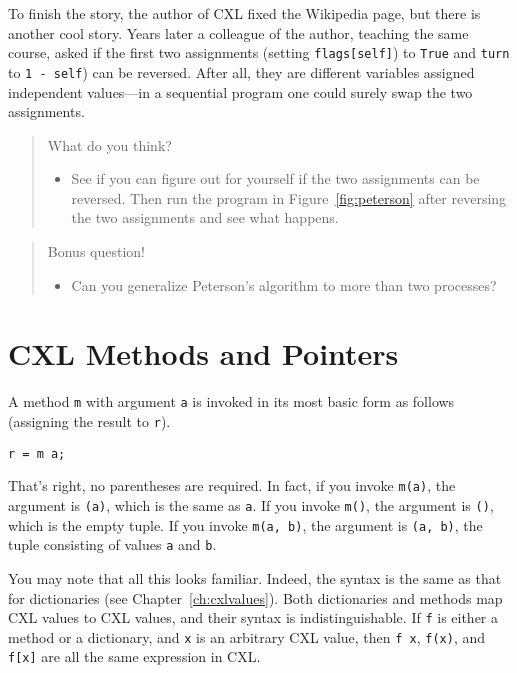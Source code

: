 \documentclass{report}
\newenvironment{code}{
\tcolorbox
}{
\endtcolorbox
}
\begin{document}
To finish the story, the author of CXL fixed the Wikipedia page, but there
is another cool story.  Years later a colleague of the author, teaching
the same course, asked if the first two assignments (setting \texttt{flags[self]})
to \texttt{True} and \texttt{turn} to \texttt{1 - self}) can be reversed.
After all, they are different variables assigned independent values---in a
sequential program one could surely swap the two assignments.

\begin{quote}
What do you think?
\begin{itemize}
\item See if you can figure out for yourself if the two assignments can be
reversed.  Then run the program in Figure~\ref{fig:peterson} after reversing
the two assignments and see what happens.
\end{itemize}
\end{quote}

\begin{quote}
Bonus question!
\begin{itemize}
\item Can you generalize Peterson's algorithm to more than two processes?
\end{itemize}
\end{quote}

\chapter{CXL Methods and Pointers}

A method \texttt{m} with argument \texttt{a} is invoked in its
most basic form as follows (assigning the result to \texttt{r}).
\begin{code}
\begin{verbatim}
r = m a;
\end{verbatim}
\end{code}
That's right, no parentheses are required.  In fact, if you invoke
\texttt{m(a)}, the argument is \texttt{(a)}, which is the same
as \texttt{a}.
If you invoke \texttt{m()}, the argument is \texttt{()},
which is the empty tuple.
If you invoke \texttt{m(a, b)}, the argument is \texttt{(a, b)},
the tuple consisting of values \texttt{a} and \texttt{b}.

You may note that all this looks familiar.  Indeed, the syntax
is the same as that for dictionaries (see Chapter~\ref{ch:cxlvalues}).
Both dictionaries and methods map CXL values to CXL values,
and their syntax is indistinguishable.
If \texttt{f} is either a method or a
dictionary, and \texttt{x} is an arbitrary CXL value, then
\texttt{f x}, \texttt{f(x)}, and \texttt{f[x]} are all
the same expression in CXL.
\end{document}
